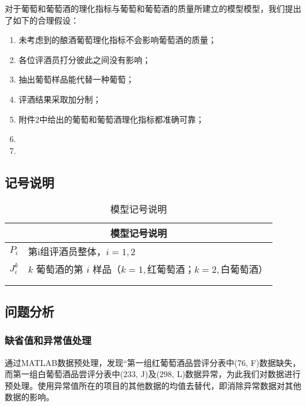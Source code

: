 \documentclass[nocover]{cumcmart}%
\begin{document}
    对于葡萄和葡萄酒的理化指标与葡萄和葡萄酒的质量所建立的模型模型，我们提出了如下的合理假设：
    \begin{enumerate}
        \item 未考虑到的酿酒葡萄理化指标不会影响葡萄酒的质量；
        \item 各位评酒员打分彼此之间没有影响；
        \item 抽出葡萄样品能代替一种葡萄；
        \item 评酒结果采取加分制；
        \item 附件2中给出的葡萄和葡萄酒理化指标都准确可靠；
        \item 
        \item 
    \end{enumerate}

    \subsection{记号说明}

    \begin{table}[!htbp]
        \centering
        \begin{tabular}{cl}
        \toprule
        \multicolumn{2}{c}{\large 模型记号说明}\\
        \midrule
            ${P_i}$         &   第i组评酒员整体，${i = 1,2}$    \\
            ${J_{i}^{k}}$ &   $k$ 葡萄酒的第 $i$ 样品（$k=1,\text{红葡萄酒；} k=2,\text{白葡萄酒}$）  \\ 
             &  \\
             &  \\
            

        \bottomrule
        \end{tabular}
        \caption{模型记号说明}
    \end{table}

    \subsection{问题分析}

        \subsubsection{缺省值和异常值处理}
        通过MATLAB数据预处理，发现“第一组红葡萄酒品尝评分表中(76, F)数据缺失，而第一组白葡萄酒品尝评分表中(233, J)及(298, L)数据异常，为此我们对数据进行预处理。使用异常值所在的项目的其他数据的均值去替代，即消除异常数据对其他数据的影响。
\end{document}
